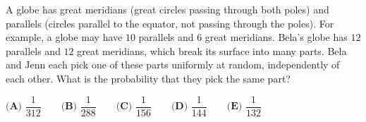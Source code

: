 A globe has great meridians (great circles passing through both poles) and parallels (circles parallel to the equator, not passing through the poles). For example, a globe may have $10$ parallels and $6$ great meridians. Bela's globe has $12$ parallels and $12$ great meridians, which break its surface into many parts. Bela and Jenn each pick one of these parts uniformly at random, independently of each other. What is the probability that they pick the same part?

$\textbf{(A) }\dfrac{1}{312}\qquad\textbf{(B) }\dfrac{1}{288}\qquad\textbf{(C) }\dfrac{1}{156}\qquad\textbf{(D) }\dfrac{1}{144}\qquad\textbf{(E) }\dfrac{1}{132}$
